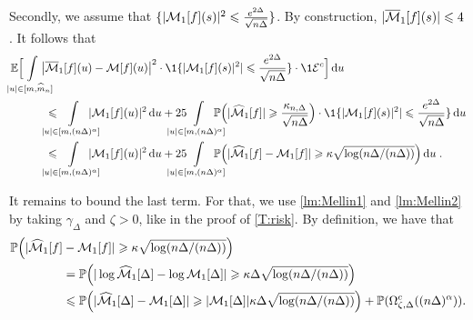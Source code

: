 Secondly, we assume that $\{|\mathcal{M}_1[f](s)|^2 \leqslant \frac{e^{2\Delta}}{\sqrt{n\Delta}}\}$. By construction, $|\overline {\mathcal{M}}_1[f](s)| \leqslant 4$. It follows that 
\begin{align*}
    \EE \Big[ \hspace{-0.5cm} \int_{|u| \in [m, \hat m_n]} \limits \hspace{-0.5cm} \big|
    & \bar \Mcal_1[f](u)- \Mcal[f](u)\big|^2 
    \cdot \1{\{|\Mcal_1[f](s)|^2| \leq \frac{e^{2\Delta}}{\sqrt{n\Delta}}\}} 
    \cdot \1{\Ecal^c} \Big] \diff u \\
    &\leq \hspace{-0.5cm} \int_{|u|\in[m, (n\Delta)^\alpha]} \limits\hspace{-0.5cm} |\Mcal_1[f](u)|^2 \diff u 
        + 25 \hspace{-0.6cm} \int_{|u| \in [m, (n\Delta)^\alpha]} \limits\hspace{-0.5cm} \PP\Big( |\hat \Mcal_1[f]| \geq \frac{\kappa_{n, \Delta}}{\sqrt{n\Delta}} \Big) \cdot \1{\{|\Mcal_1[f](s)|^2| \leq \frac{e^{2\Delta}}{\sqrt{n\Delta}}\}} \diff u \\
    &\leq \hspace{-0.5cm} \int_{|u|\in[m, (n\Delta)^\alpha]} \limits\hspace{-0.5cm} |\Mcal_1[f](u)|^2 \diff u 
    + 25 \hspace{-0.6cm} \int_{|u| \in [m, (n\Delta)^\alpha]} \limits\hspace{-0.5cm} \PP\Big( |\hat \Mcal_1[f] - \Mcal_1[f]| \geq \kappa \sqrt{\log(n\Delta/(n\Delta))} \Big)  \diff u
    \eqfinp
\end{align*}

It remains to bound the last term. For that, we use \cref{lm:Mellin1} and \cref{lm:Mellin2} by taking $\gamma_\Delta$ and $\zeta > 0$, like in the proof of \cref{T:risk}. By definition, we have that 
\begin{align*}
    \mathbb{P}\Big( |\widehat {\mathcal{M}}_1[f] &- \mathcal{M}_1[f]| \geqslant \kappa \sqrt{\log(n\Delta/(n\Delta))} \Big)  \\
    &= 
    \mathbb{P}\Big( |\log \widehat {\mathcal{M}}_1[\Delta] - \log \mathcal{M}_1[\Delta]| \geqslant \kappa \Delta \sqrt{\log(n\Delta/(n\Delta))} \Big)  \\
    &\leqslant 
    \mathbb{P}\Big( | \widehat {\mathcal{M}}_1[\Delta] - \mathcal{M}_1[\Delta]| \geqslant |\mathcal{M}_1[\Delta]|\kappa \Delta \sqrt{\log(n\Delta/(n\Delta))} \Big)  + \mathbb{P}(\Omega_{\zeta, \Delta}^c((n\Delta)^\alpha)).
\end{align*}

